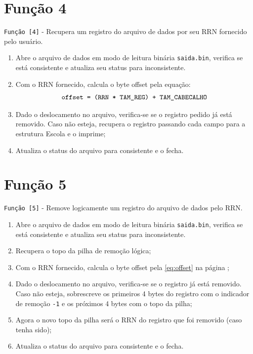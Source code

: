 \documentclass[
	12pt,				%
	openany,			%
	twoside,			%
	a4paper,			%
	english,			%
	french,				%
	spanish,			%
	brazil,				%
]{abntex2}
\begin{document}
	\section{Função 4}

		\verb|Função [4]| - Recupera um registro do arquivo de dados por seu RRN fornecido pelo usuário.

		\begin{enumerate}
			\item Abre o arquivo de dados em modo de leitura binária \verb|saida.bin|, verifica se está consistente e atualiza seu status para inconsistente.
			\item Com o RRN fornecido, calcula o byte offset pela equação:
			\begin{equation}
			\verb|offset = (RRN * TAM_REG) + TAM_CABECALHO|
			\label{eq:offset}
			\end{equation}
			\item Dado o deslocamento no arquivo, verifica-se se o registro pedido já está removido. Caso não esteja, recupera o registro passando cada campo para a estrutura Escola e o imprime;
			\item Atualiza o status do arquivo para consistente e o fecha.
		\end{enumerate}

	\section{Função 5}

		\verb|Função [5]| - Remove logicamente um registro do arquivo de dados pelo RRN.

		\begin{enumerate}
			\item Abre o arquivo de dados em modo de leitura binária \verb|saida.bin|, verifica se está consistente e atualiza seu status para inconsistente.
			\item Recupera o topo da pilha de remoção lógica;
			\item Com o RRN fornecido, calcula o byte offset pela \autoref{eq:offset} na página \pageref{eq:offset};
			\item Dado o deslocamento no arquivo, verifica-se se o registro já está removido. Caso não esteja, sobrescreve os primeiros 4 bytes do registro com o indicador de remoção \verb|-1| e os próximos 4 bytes com o topo da pilha;
			\item Agora o novo topo da pilha será o RRN do registro que foi removido (caso tenha sido);
			\item Atualiza o status do arquivo para consistente e o fecha.
		\end{enumerate}
\end{document}
